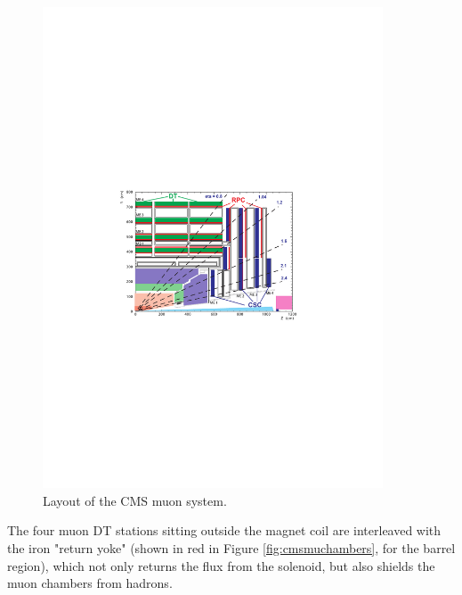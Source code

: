     \begin{figure}[H]
 	\centering
 	\includegraphics[width=0.9\textwidth]{figures/CMS_muon_system.pdf}
 	\singlespace
 	\caption{Layout of the CMS muon system.}
 	\label{fig:cmsmuonsys}
	\end{figure}

The four muon DT stations sitting outside the magnet coil are interleaved with the
iron "return yoke" (shown in red in Figure \ref{fig:cmsmuchambers}, for the barrel region), which not only returns the flux from the solenoid, but also shields the muon chambers from hadrons. 

